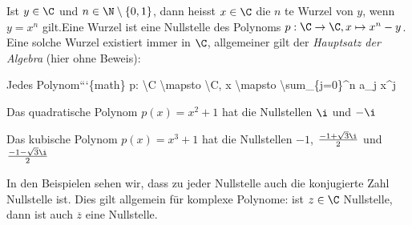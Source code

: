 \documentclass[letterpaper,10pt,english]{jupyterBook}
\begin{document}
Ist \(y \in \C\) und \(n\in \N\setminus\{0,1\}\), dann heisst \(x \in \C\) die \(n\) te Wurzel von \(y\), wenn \(y=x^n\) gilt.Eine Wurzel ist eine Nullstelle des Polynoms \(p:\C \rightarrow \C, x \mapsto x^n-y\). Eine solche Wurzel existiert immer in \(\C\), allgemeiner gilt der \emph{Hauptsatz der Algebra} (hier ohne Beweis):
\label{grundlagen/zahlensysteme:theorem-31}
\begin{theorem}{}{}



Jedes Polynom```\{math\}
p: \textbackslash{}C \textbackslash{}mapsto \textbackslash{}C, x \textbackslash{}mapsto \textbackslash{}sum\_\{j=0\}\textasciicircum{}n a\_j x\textasciicircum{}j


\end{theorem}
\label{grundlagen/zahlensysteme:example-32}
\begin{example}{}{}



Das quadratische Polynom \(p(x) =x^2+1\) hat die Nullstellen \(\i\) und \(-\i\)
\end{example}
\label{grundlagen/zahlensysteme:example-33}
\begin{example}{}{}



Das kubische Polynom \(p(x) =x^3+1\) hat die Nullstellen \(-1\), \(\frac{-1+\sqrt{3}\i}2\) und \(\frac{-1-\sqrt{3}\i}2\)
\end{example}

In den Beispielen sehen wir, dass zu jeder Nullstelle auch die konjugierte Zahl Nullstelle ist. Dies gilt allgemein für komplexe Polynome: ist \(z \in \C\) Nullstelle, dann ist auch \(\overline{z}\) eine Nullstelle.
\end{document}
